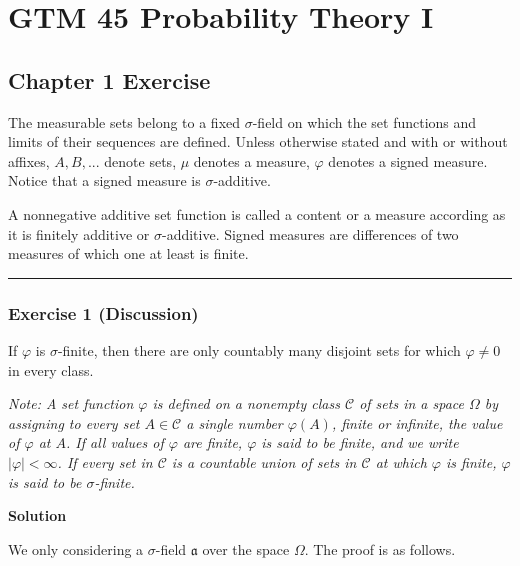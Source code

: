 \documentclass[
]{article}
\author{}
\date{}
\begin{document}
\hypertarget{gtm-45-probability-theory-i}{%
  \section{GTM 45 Probability Theory
    I}\label{gtm-45-probability-theory-i}}

\hypertarget{chapter-1-exercise}{%
  \subsection{Chapter 1 Exercise}\label{chapter-1-exercise}}

The measurable sets belong to a fixed \(\sigma\)-field on which the set
functions and limits of their sequences are defined. Unless otherwise
stated and with or without affixes, \(A, B, ...\) denote sets, \(\mu\)
denotes a measure, \(\varphi\) denotes a signed measure. Notice that a
signed measure is \(\sigma\)-additive.

A nonnegative additive set function is called a content or a measure
according as it is finitely additive or \(\sigma\)-additive. Signed
measures are differences of two measures of which one at least is
finite.

\begin{center}\rule{0.5\linewidth}{0.5pt}\end{center}

\hypertarget{exercise-1-discussion}{%
  \subsubsection{Exercise 1 (Discussion)}\label{exercise-1-discussion}}

If \(\varphi\) is \(\sigma\)-finite, then there are only countably many
disjoint sets for which \(\varphi \neq 0\) in every class.

\emph{Note: A set function \(\varphi\) is defined on a nonempty class
  \(\mathcal{C}\) of sets in a space \(\Omega\) by assigning to every set
  \(A \in \mathcal{C}\) a single number \(\varphi(A)\), finite or
  infinite, the value of \(\varphi\) at \(A\). If all values of
  \(\varphi\) are finite, \(\varphi\) is said to be finite, and we write
  \(|\varphi|<\infty\). If every set in \(\mathcal{C}\) is a countable
  union of sets in \(\mathcal{C}\) at which \(\varphi\) is finite,
  \(\varphi\) is said to be \(\sigma \)-finite.}

\textbf{Solution}

We only considering a \(\sigma\)-field \(\mathfrak{a}\) over the space
\(\Omega\). The proof is as follows.
\end{document}
